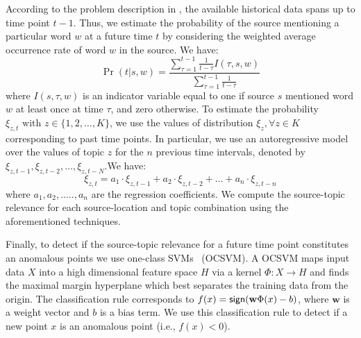 \documentclass[conference]{IEEEtran}
\begin{document}
According to the problem description in , the available historical 
data spans up to time point $t-1$. Thus, we estimate the probability of the source 
mentioning a particular word $w$ at a future time $t$ by considering the weighted average occurrence rate of word $w$ in the source. We have:
\begin{equation}
\Pr(t|s,w) = \frac{\sum_{\tau = 1}^{t-1} \frac{1}{t - \tau}I(\tau,s,w)}{\sum_{\tau = 1}^{t-1} \frac{1}{t - \tau}}
\end{equation}
where $I(s,\tau,w)$ is an indicator variable equal to one if source $s$ mentioned word $w$ at least once at time $\tau$, and zero otherwise. 
To estimate the probability $\xi_{z,t} \mbox{ with } z \in \{1, 2, \dots, K\}$, 
we use the values of distribution $\xi_{z}, \forall z \in K$ corresponding to past time points. In particular, we use an autoregressive model over the values of topic $z$ for the $n$ previous time intervals, denoted by $\xi_{z,t-1},\xi_{z,t-2},\dots,\xi_{z,t-N}$.We have:
\begin{equation}
\xi_{z,t}=a_1 \cdot \xi_{z,t-1}+a_2\cdot \xi_{z,t-2}+\dots +a_n\cdot \xi_{z,t-n}
\end{equation}
where $a_1,a_2,.....,a_n$ are the regression coefficients.  We compute the source-topic relevance for each source-location and topic combination using the aforementioned techniques.

Finally, to detect if the source-topic relevance for a future time point constitutes an anomalous points we use one-class SVMs~\cite{schoelkopf:99} (OCSVM). A OCSVM maps input data $X$ into a high dimensional feature space $H$ via a kernel $\Phi: X \rightarrow H$ and finds the maximal margin hyperplane which best separates the training data from the origin. The classification rule corresponds to $f(x) = {\sf sign}(\mathbf{w}\Phi(x) - b)$, where $\mathbf{w}$ is a weight vector and $b$ is a bias term. We use this classification rule to detect if a new point $x$ is an anomalous point (i.e., $f(x) < 0$). 
\end{document}
